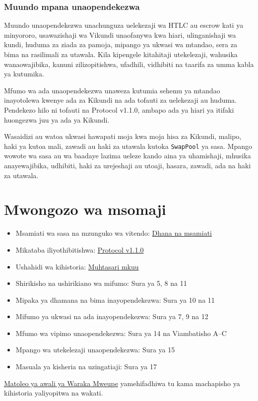 \documentclass[11pt]{article}
\begin{document}
\subsubsection*{Muundo mpana unaopendekezwa}

Muundo unaopendekezwa unachunguza uelekezaji wa HTLC au escrow kati ya minyororo, usawazishaji wa Vikundi unaofanywa kwa hiari, ulinganishaji wa kundi, huduma za ziada za pamoja, mipango ya ukwasi wa mtandao, sera za bima na rasilimali za utawala. Kila kipengele kitahitaji utekelezaji, wahusika wanaowajibika, kanuni zilizopitishwa, ufadhili, vidhibiti na taarifa za umma kabla ya kutumika.

Mfumo wa ada unaopendekezwa unaweza kutumia sehemu ya mtandao inayotolewa kwenye ada za Kikundi na ada tofauti za uelekezaji au huduma. Pendekezo hilo ni tofauti na Protocol v1.1.0, ambapo ada ya hiari ya itifaki huongezwa juu ya ada ya Kikundi.

Wasaidizi au watoa ukwasi hawapati moja kwa moja hisa za Kikundi, malipo, haki ya kutoa mali, zawadi au haki za utawala kutoka \texttt{SwapPool} ya sasa. Mpango wowote wa sasa au wa baadaye lazima ueleze kando aina ya uhamishaji, mhusika anayewajibika, udhibiti, haki za urejeshaji au utoaji, hasara, zawadi, ada na haki za utawala.

\section*{Mwongozo wa msomaji}

\begin{itemize}[leftmargin=*]
\item Msamiati wa sasa na mzunguko wa vitendo: \href{https://docs.cosmolocal.credit/sw/introduction/concepts}{Dhana na msamiati}
\item Mikataba iliyothibitishwa: \href{https://docs.cosmolocal.credit/sw/protocol/overview}{Protocol v1.1.0}
\item Ushahidi wa kihistoria: \href{https://docs.cosmolocal.credit/sw/white-paper/executive-summary}{Muhtasari mkuu}
\item Shirikisho na ushirikiano wa mifumo: Sura ya 5, 8 na 11
\item Mipaka ya dhamana na bima inayopendekezwa: Sura ya 10 na 11
\item Mifumo ya ukwasi na ada inayopendekezwa: Sura ya 7, 9 na 12
\item Mfumo wa vipimo unaopendekezwa: Sura ya 14 na Viambatisho A--C
\item Mpango wa utekelezaji unaopendekezwa: Sura ya 15
\item Masuala ya kisheria na uzingatiaji: Sura ya 17
\end{itemize}
\href{https://docs.cosmolocal.credit/sw/white-paper/archive}{Matoleo ya awali ya Waraka Mweupe} yamehifadhiwa tu kama machapisho ya kihistoria yaliyopitwa na wakati.
\end{document}

